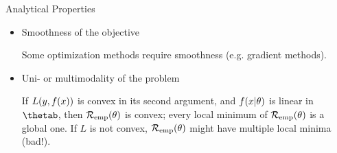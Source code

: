 \begin{vbframe}{Analytical Properties}

\begin{itemize}
  \item Smoothness of the objective \\
  \begin{footnotesize} 
  Some optimization methods require smoothness (e.g. gradient methods).
  \end{footnotesize}
  \item Uni- or multimodality of the problem \\
  \begin{footnotesize} 
  If $L(y, f(x))$ is convex in its second argument, and $f(x | \theta)$ is linear in $\thetab$, then $\mathcal{R}_{\text{emp}}(\theta)$ is convex; every local minimum of $\mathcal{R}_{\text{emp}}(\theta)$ is a global one. If $L$ is not convex, $\mathcal{R}_{\text{emp}}(\theta)$ might have multiple local minima (bad!).
  \end{footnotesize}
\end{itemize}


\end{vbframe}
















